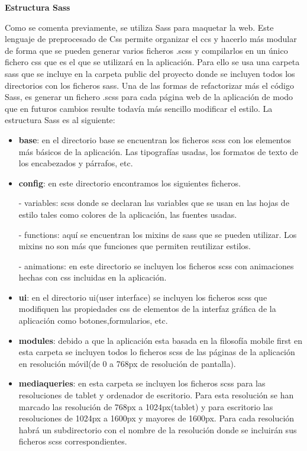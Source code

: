 \textbf{Estructura Sass} 

Como se comenta previamente, se utiliza Sass para maquetar la web. Este lenguaje de preprocesado de Css permite organizar el ccs y hacerlo más modular de forma que se pueden generar varios ficheros .scss y compilarlos en un único fichero css que es el que se utilizará en la aplicación. Para ello se usa una carpeta sass que se incluye en la carpeta public del proyecto donde se incluyen todos los directorios con los ficheros sass. Una de las formas de refactorizar más el código Sass, es generar un fichero .scss para cada página web de la aplicación de modo que en futuros cambios resulte todavía más sencillo modificar el estilo. La estructura Sass es al siguiente:


\begin{itemize}

\item \textbf{base}: en el directorio base se encuentran los ficheros scss con los elementos más básicos de la aplicación. Las tipografías usadas, los formatos de texto de los encabezados y párrafos, etc.

\item \textbf{config}: en este directorio encontramos los siguientes ficheros.

- variables: scss donde se declaran las variables que se usan en las hojas de estilo tales como colores de la aplicación, las fuentes usadas.

- functions: aquí se encuentran los mixins de sass que se pueden utilizar. Los mixins no son más que funciones que permiten reutilizar estilos.

- animations: en este directorio se incluyen los ficheros scss con animaciones hechas con css incluidas en la aplicación.

\item \textbf{ui}: en el directorio ui(user interface) se incluyen los ficheros scss que modifiquen las propiedades css de elementos de la interfaz gráfica de la aplicación como botones,formularios, etc.

\item \textbf{modules}: debido a que la aplicación esta basada en la filosofía mobile first en esta carpeta se incluyen todos lo ficheros scss de las páginas de la aplicación en resolución móvil(de 0 a 768px de resolución de pantalla).

\item \textbf{mediaqueries}: en esta carpeta se incluyen los ficheros scss para las resoluciones de tablet y ordenador de escritorio. Para esta resolución se han marcado las resolución de 768px a 1024px(tablet) y para escritorio las resoluciones de 1024px a 1600px y mayores de 1600px. Para cada resolución habrá un subdirectorio con el nombre de la resolución donde se incluirán sus ficheros scss correspondientes.


\end{itemize}

